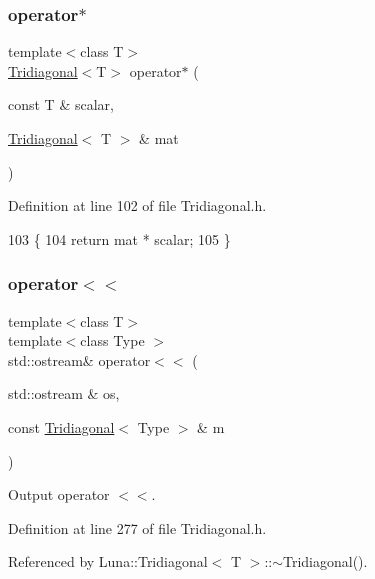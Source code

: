 \subsubsection{\texorpdfstring{operator$\ast$}{operator*}}
{\footnotesize\ttfamily template$<$class T$>$ \\
\hyperlink{classLuna_1_1Tridiagonal}{Tridiagonal}$<$T$>$ operator$\ast$ (\begin{DoxyParamCaption}\item[{const T \&}]{scalar,  }\item[{\hyperlink{classLuna_1_1Tridiagonal}{Tridiagonal}$<$ T $>$ \&}]{mat }\end{DoxyParamCaption})\hspace{0.3cm}{\ttfamily [friend]}}



Definition at line 102 of file Tridiagonal.\+h.


\begin{DoxyCode}
103     \{
104       \textcolor{keywordflow}{return} mat * scalar;
105     \}
\end{DoxyCode}
\mbox{\label{classLuna_1_1Tridiagonal_aa1c4dcdd1f5d0158cbe438b3e21ff84c}} 
\subsubsection{\texorpdfstring{operator$<$$<$}{operator<<}}
{\footnotesize\ttfamily template$<$class T$>$ \\
template$<$class Type $>$ \\
std\+::ostream\& operator$<$$<$ (\begin{DoxyParamCaption}\item[{std\+::ostream \&}]{os,  }\item[{const \hyperlink{classLuna_1_1Tridiagonal}{Tridiagonal}$<$ Type $>$ \&}]{m }\end{DoxyParamCaption})\hspace{0.3cm}{\ttfamily [friend]}}



Output operator $<$$<$. 



Definition at line 277 of file Tridiagonal.\+h.



Referenced by Luna\+::\+Tridiagonal$<$ T $>$\+::$\sim$\+Tridiagonal().


